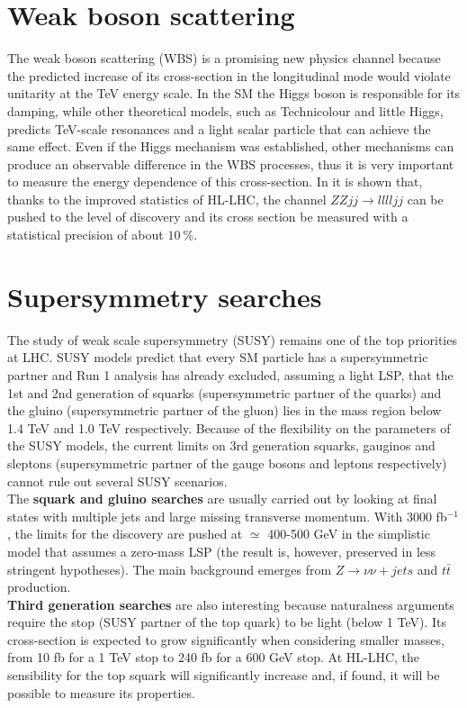 \documentclass[a4paper,twoside,12pt]{book}
\begin{document}
\section{Weak boson scattering}
The weak boson scattering (WBS) is a promising new physics channel because the predicted increase of
its cross-section
in the longitudinal mode would violate unitarity at the TeV energy scale. In the SM the Higgs
boson is responsible for its damping, while other theoretical models, such as Technicolour and 
little Higgs, predicts TeV-scale resonances and a light scalar particle that can achieve the same effect. Even if the Higgs
mechanism was established, other mechanisms can produce an observable difference in
the WBS processes, thus it is very important to measure the energy 
dependence of this cross-section. In \cite{WBS} it is shown that, thanks to the improved
statistics of HL-LHC, the channel $ZZjj \rightarrow lllljj$ can be pushed to the level of discovery and its cross section be measured with a statistical precision of about $10\ \%$.

\section{Supersymmetry searches}
The study of weak scale supersymmetry (SUSY) remains one of the top priorities at LHC.
SUSY models predict that every SM particle has a supersymmetric partner and Run 1 analysis
has already excluded, assuming a light LSP, that the 1st and 2nd generation of squarks (supersymmetric partner of the quarks) and the gluino (supersymmetric partner of the gluon) lies in the mass region below 1.4 TeV and 1.0
TeV respectively. Because of the flexibility on the parameters of the SUSY models, 
the current limits on 3rd generation squarks, gauginos and sleptons (supersymmetric partner
of the gauge bosons and leptons respectively) cannot rule out several SUSY scenarios.\\

The \textbf{squark and gluino searches} are usually carried out by looking at final states
with multiple jets and large missing transverse momentum. With 3000 fb$^{-1}$, the limits for the discovery are pushed at $\simeq$ 400-500 GeV\cite{loi} in the 
simplistic model that assumes a zero-mass LSP (the result is, however, preserved in less
stringent hypotheses). The main background emerges from $Z \rightarrow \nu\nu + jets$ and 
$t\bar{t}$ production.\\

\textbf{Third generation searches} are also interesting because naturalness arguments require
the stop (SUSY partner of the top quark) to be light (below 1 TeV). Its cross-section is expected to grow significantly when 
considering smaller masses, from 10 fb for a 1 TeV stop to 240 fb for a 600 GeV stop. At
HL-LHC, the sensibility for the top squark will significantly increase and, if found, it will be possible to measure its properties. \\
\end{document}
